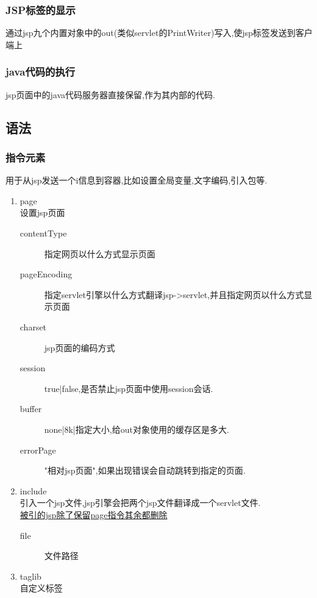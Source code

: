 \subsubsection{JSP标签的显示}
通过jsp九个内置对象中的out(类似servlet的PrintWriter)写入,使jsp标签发送到客户端上

\subsubsection{java代码的执行}
jsp页面中的java代码服务器直接保留,作为其内部的代码.

\subsection{语法}
\subsubsection{指令元素}
用于从jsp发送一个i信息到容器,比如设置全局变量,文字编码,引入包等.
\begin{enumerate}
\item page\\
设置jsp页面
\begin{description}
\item[contentType]	指定网页以什么方式显示页面
\item[pageEncoding]	指定servlet引擎以什么方式翻译jsp->servlet,并且指定网页以什么方式显示页面
\item[charset]	jsp页面的编码方式
\item[session]	true|false,是否禁止jsp页面中使用session会话.
\item[buffer]	none|8k|指定大小,给out对象使用的缓存区是多大.
\item[errorPage]	"相对jsp页面",如果出现错误会自动跳转到指定的页面.
\end{description}

\item include \\
引入一个jsp文件,jsp引擎会把两个jsp文件翻译成一个servlet文件.\\
\underline{被引的jsp除了保留page指令其余都删除}
\begin{description}
\item[file]	文件路径
\end{description}

\item taglib \\
自定义标签

\end{enumerate}

